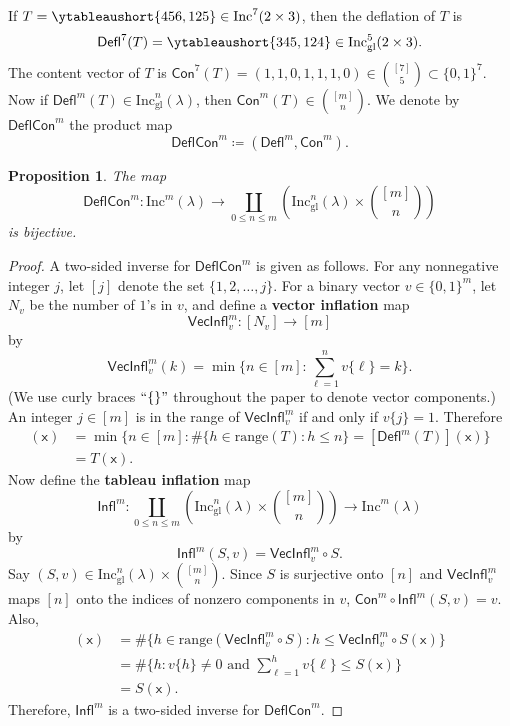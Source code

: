 \documentclass[12pt]{amsart}
\newcommand{\x}{\ensuremath{\mathsf{x}}}
\newtheorem{proposition}[theorem]{Proposition}
\theoremstyle{definition}
\newenvironment{example}
  {\pushQED{\qed}\renewcommand{\qedsymbol}{$\diamondsuit$}\examplex}
  {\popQED\endexamplex}
\theoremstyle{remark}
\numberwithin{equation}{section}
\newcommand{\inc}{\ensuremath{\mathrm{Inc}}}
\newcommand{\incgl}{\inc_{\mathrm{gl}}}
\newcommand{\deflate}{\ensuremath{\mathsf{Defl}}}
\newcommand{\inflate}{\ensuremath{\mathsf{VecInfl}}}
\newcommand{\tinflate}{\ensuremath{\mathsf{Infl}}}
\newcommand{\content}{\ensuremath{\mathsf{Con}}}
\newcommand{\compress}{\ensuremath{\mathsf{DeflCon}}}
\begin{document}
\begin{example}\label{ex:deflate}
If $T = \ytableaushort{456,125} \in \inc^7(2 \times 3)$, then the deflation of $T$ is \[\deflate^7(T) = \ytableaushort{345,124} \in \incgl^5(2 \times 3).\] The content vector of $T$ is $\content^7(T) = (1,1,0,1,1,1,0) \in \binom{[7]}{5} \subset \{0,1\}^7$.
\end{example}
Now if $\deflate^m(T) \in \incgl^n(\lambda)$, then $\content^m(T) \in \binom{[m]}{n}$. We denote by $\compress^m$ the product map
\[
\compress^m \coloneqq (\deflate^m,\content^m).
\] 
\begin{proposition}\label{prop:compressbijective} The map 
\[
\compress^m : \inc^m(\lambda) \to \coprod_{0 \leq n \leq m} \left( \incgl^n(\lambda) \times \binom{[m]}{n} \right)
\]
 is bijective.
\end{proposition}
\begin{proof}
A two-sided inverse for $\compress^m$ is given as follows. For any nonnegative integer $j$, let $[j]$ denote the set $\{1, 2, \dots, j\}$.
For a binary vector $v \in \{0,1\}^m$, let $N_v$ be the number of $1$'s in $v$, and define a {\bf vector inflation} map \[\inflate^m_v : [N_v] \to [m]\] by
\[ \inflate^m_v(k) = \min \bigg\lbrace n \in [m]:   \sum_{\ell = 1}^n v\lbrace \ell \rbrace = k \bigg\rbrace.\] (We use curly braces $``\{\}"$ throughout the paper to denote vector components.) An integer $j \in [m]$ is in the range of $\inflate^m_v$ if and only if $v\lbrace j \rbrace = 1$. Therefore
\begin{align*}
[\inflate^m_{\content^m(T)} \circ \deflate^m(T)](\x) &= \min \bigg\lbrace n \in [m]:    \# \{ h \in \mathrm{range}(T): h \leq n \} = [\deflate^m(T)](\x) \bigg\rbrace \\ &= T(\x). 
\end{align*} Now define the {\bf tableau inflation} map 
\[
\tinflate^m : \coprod_{0 \leq n \leq m} \left( \incgl^n(\lambda) \times \binom{[m]}{n} \right) \to \inc^m(\lambda)
\] 
by 
\[
\tinflate^m(S,v) = \inflate^m_v \circ S.
\]
Say $(S,v) \in \incgl^n(\lambda) \times \binom{[m]}{n}$. Since $S$ is surjective onto $[n]$ and $\inflate^m_v$ maps $[n]$ onto the indices of nonzero components in $v$, $\content^m \circ \tinflate^m(S,v) = v$.  Also,
\begin{align*}
 [\deflate^m(\inflate^m_v  \circ S)](\x) &= \# \{ h \in \mathrm{range}(\inflate^m_v \circ S): h \leq \inflate^m_v \circ S(\x) \} \\  
 &= \# \{ h: v\{h\} \neq 0 \text{ and } \sum_{\ell = 1}^h v\{\ell\} \leq S(\x)  \} \\
 &= S(\x).
\end{align*}
Therefore, $\tinflate^m$ is a two-sided inverse for $\compress^m$.
\end{proof} 
\end{document}
